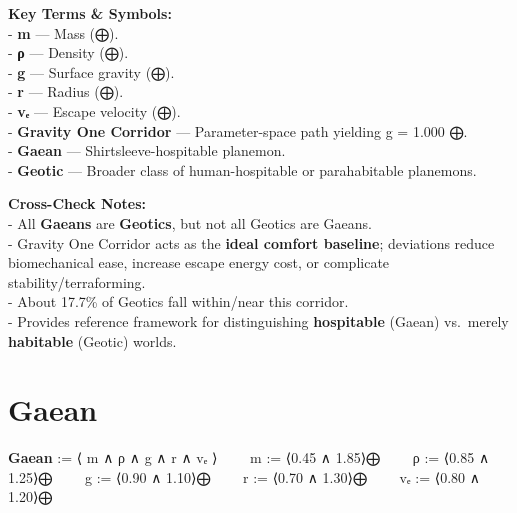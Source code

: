\documentclass[
  letterpaper,
]{book}
\begin{document}
\textbf{Key Terms \& Symbols:}\\
- \textbf{m} --- Mass (⨁).\\
- \textbf{ρ} --- Density (⨁).\\
- \textbf{g} --- Surface gravity (⨁).\\
- \textbf{r} --- Radius (⨁).\\
- \textbf{vₑ} --- Escape velocity (⨁).\\
- \textbf{Gravity One Corridor} --- Parameter-space path yielding g =
1.000 ⨁.\\
- \textbf{Gaean} --- Shirtsleeve-hospitable planemon.\\
- \textbf{Geotic} --- Broader class of human-hospitable or parahabitable
planemons.

\textbf{Cross-Check Notes:}\\
- All \textbf{Gaeans} are \textbf{Geotics}, but not all Geotics are
Gaeans.\\
- Gravity One Corridor acts as the \textbf{ideal comfort baseline};
deviations reduce biomechanical ease, increase escape energy cost, or
complicate stability/terraforming.\\
- About 17.7\% of Geotics fall within/near this corridor.\\
- Provides reference framework for distinguishing \textbf{hospitable}
(Gaean) vs.~merely \textbf{habitable} (Geotic) worlds.

\section{Gaean}\label{gaean}

\textbf{Gaean} := ⟨ m ∧ ρ ∧ g ∧ r ∧ vₑ ⟩   m := ⟨0.45 ∧ 1.85⟩⨁   ρ :=
⟨0.85 ∧ 1.25⟩⨁   g := ⟨0.90 ∧ 1.10⟩⨁   r := ⟨0.70 ∧ 1.30⟩⨁   vₑ := ⟨0.80
∧ 1.20⟩⨁
\end{document}
